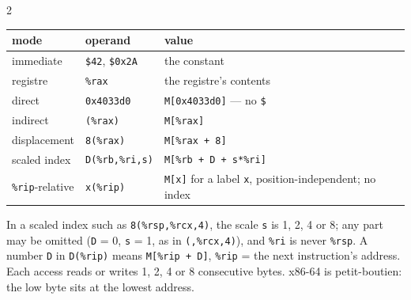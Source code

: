 \begin{multicols}{2}
\smallskip
\begin{tabularx}{\linewidth}{@{}llX@{}}
\toprule
mode & operand & value \\
\midrule
immediate     & \texttt{\$42}, \texttt{\$0x2A} & the constant \\
registre      & \texttt{\%rax}              & the registre's contents \\
direct        & \texttt{0x4033d0}           & \texttt{M[0x4033d0]} --- no \texttt{\$} \\
indirect      & \texttt{(\%rax)}            & \texttt{M[\%rax]} \\
displacement  & \texttt{8(\%rax)}           & \texttt{M[\%rax + 8]} \\
scaled index  & \texttt{D(\%rb,\%ri,s)}     & \texttt{M[\%rb + D + s*\%ri]} \\
\texttt{\%rip}-relative & \texttt{x(\%rip)} & \texttt{M[x]} for a label \texttt{x}, position-independent; no index \\
\bottomrule
\end{tabularx}
In a scaled index such as \texttt{8(\%rsp,\%rcx,4)}, the scale \texttt{s} is 1, 2, 4 or 8; any
part may be omitted (\texttt{D} = 0, \texttt{s} = 1, as in \texttt{(,\%rcx,4)}),
and \texttt{\%ri} is never \texttt{\%rsp}. A number \texttt{D} in \texttt{D(\%rip)} means
\texttt{M[\%rip + D]}, \texttt{\%rip} = the next instruction's address. Each access reads or writes 1, 2, 4 or
8 consecutive bytes. x86-64 is petit-boutien: the low
byte sits at the lowest address.
\end{multicols}

